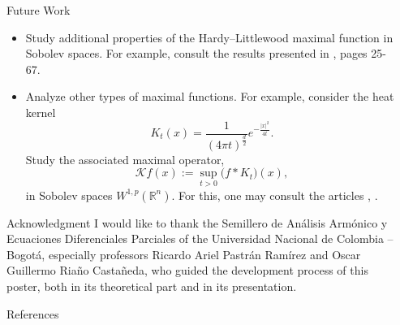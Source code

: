 \documentclass[final]{beamer}
\newlength{\sepwidth}
\newlength{\colwidth}
\newcommand{\separatorcolumn}{\begin{column}{\sepwidth}\end{column}}
\begin{document}
\begin{frame}[t]
\begin{columns}[t]
\begin{column}{\colwidth}
\begin{exampleblock}{Future Work}
  \begin{itemize}
    \item Study additional properties of the Hardy–Littlewood maximal function in Sobolev spaces. For example, consult the results presented in \cite{Mazya2009}, pages 25-67.
    \item Analyze other types of maximal functions. For example, consider the heat kernel
    \begin{equation*}
      K_t(x)=\frac{1}{(4\pi t)^{\frac{d}{2}}}e^{-\frac{|x|^2}{4t}}. 
    \end{equation*}
    Study the associated maximal operator,
    \begin{equation*}
      \mathcal{K} f(x):=\sup_{t>0}\big(f\ast K_t\big)(x),
    \end{equation*}
    in Sobolev spaces $W^{1,p}(\mathbb{R}^n)$. For this, one may consult the articles \cite{CarneiroFinderSousa2018}, \cite{CarneiroBenar2013}.
  \end{itemize}
\end{exampleblock}

\begin{block}{Acknowledgment}
  I would like to thank the Semillero de Análisis Armónico y Ecuaciones Diferenciales Parciales of the Universidad Nacional de Colombia – Bogotá, especially professors Ricardo Ariel Pastrán Ramírez and Oscar Guillermo Riaño Castañeda, who guided the development process of this poster, both in its theoretical part and in its presentation. 
\end{block}

  \begin{block}{References}

    \nocite{*}
    \footnotesize{
      
      
    }

  \end{block}

\end{column}
\separatorcolumn



\end{columns}
\end{frame}
\end{document}
